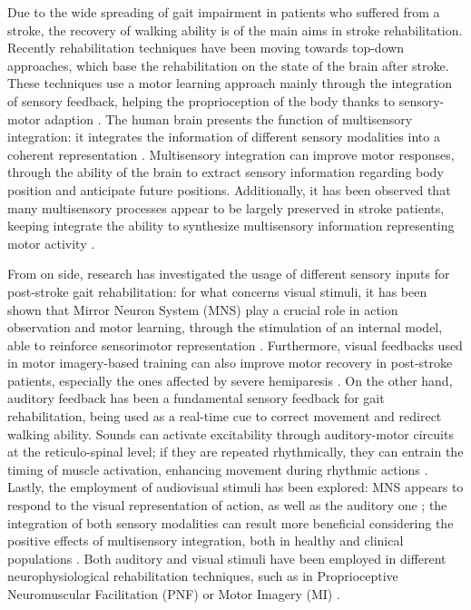 Due to the wide spreading of gait impairment in patients who suffered from a stroke, the recovery of walking ability is of the main aims in stroke rehabilitation. Recently rehabilitation techniques have been moving towards top-down approaches, which base the rehabilitation on the state of the brain after stroke. These techniques use a motor learning approach mainly through the integration of sensory feedback, helping the proprioception of the body thanks to sensory-motor adaption \parencite{Belda-Lois_2011}. 
The human brain presents the function of multisensory integration: it integrates the information of different sensory modalities into a coherent representation \parencite{Stein_2008}. Multisensory integration can improve motor responses, through the ability of the brain to extract sensory information regarding body position and anticipate future positions. Additionally, it has been observed that many multisensory processes appear to be largely preserved in stroke patients, keeping integrate the ability to synthesize multisensory information representing motor activity \parencite{Bolognini_2013}.

From on side, research has investigated the usage of different sensory inputs for post-stroke gait rehabilitation: for what concerns visual stimuli, it has been shown that Mirror Neuron System (MNS) play a crucial role in action observation and motor learning, through the stimulation of an internal model, able to reinforce sensorimotor representation \parencite{Rizzolati_2004}. Furthermore, visual feedbacks used in motor imagery-based training can also improve motor recovery in post-stroke patients, especially the ones affected by severe hemiparesis \parencite{Mihara_2013}. 
On the other hand, auditory feedback has been a fundamental sensory feedback for gait rehabilitation, being used as a real-time cue to correct movement and redirect walking ability. Sounds can activate excitability through auditory-motor circuits at the reticulo-spinal level; if they are repeated rhythmically, they can entrain the timing of muscle activation, enhancing movement during rhythmic actions \parencite{Thaut_1999}. 
Lastly, the employment of audiovisual stimuli has been explored: MNS appears to respond to the visual representation of action, as well as the auditory one \parencite{Rizzolati_2004}; the integration of both sensory modalities can result more beneficial considering the positive effects of multisensory integration, both in healthy and clinical populations \parencite{Bolognini_2015}. 
Both auditory and visual stimuli have been employed in different neurophysiological rehabilitation techniques, such as in Proprioceptive Neuromuscular Facilitation (PNF) \parencite{Moros_2000} or Motor Imagery (MI) \parencite{Mason_2007}. 


